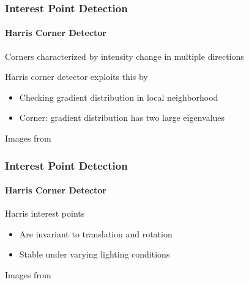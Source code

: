 \documentclass[xetex,professionalfont]{beamer}
\begin{document}
\begin{frame}
\frametitle{Interest Point Detection}
\framesubtitle{Harris Corner Detector}

Corners characterized by intensity change in multiple directions

\bigskip
Harris corner detector exploits this by
\begin{itemize}
	\item Checking gradient distribution in local neighborhood
	\item Corner: gradient distribution has two large eigenvalues
\end{itemize}

\begin{center}
	{\centering Images from \cite{szeliski2010}}
\end{center}

\end{frame}


\begin{frame}
\frametitle{Interest Point Detection}
\framesubtitle{Harris Corner Detector}

Harris interest points
\begin{itemize}
	\item Are invariant to translation and rotation
	\item Stable under varying lighting conditions %
\end{itemize} %

\medskip
\begin{center}
	{\centering Images from \cite{tuytelaars2008}}
\end{center}

\end{frame}
\end{document}
